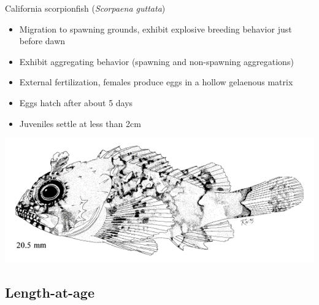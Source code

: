 \documentclass[ignorenonframetext,compress]{beamer}
\begin{document}
\begin{frame}{California scorpionfish (\emph{Scorpaena guttata})}

\begin{itemize} 
\item[\checkmark] Migration to spawning grounds, exhibit explosive breeding behavior just before dawn
\item[\checkmark] Exhibit aggregating behavior (spawning and non-spawning aggregations)  
\item[\checkmark] External fertilization, females produce eggs in a hollow gelaenous matrix
\item[\checkmark] Eggs hatch after about 5 days
\item[\checkmark] Juveniles settle at less than 2cm 
\end{itemize}

\centering
\includegraphics[width=.5\textwidth]{Figures/baby_scorp}


\end{frame}

\subsection{Length-at-age}\label{length-at-age}
\end{document}
